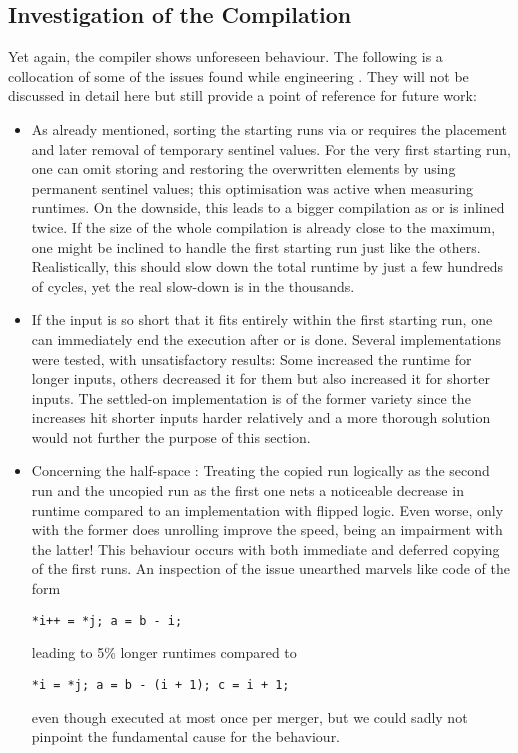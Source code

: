 \subsection*{Investigation of the Compilation}
\label{sec:tasklet:merge:compilation}

Yet again, the compiler shows unforeseen behaviour.
The following is a collocation of some of the issues found while engineering \MS{}.
They will not be discussed in detail here but still provide a point of reference for future work:
\begin{itemize}
	\item
	As already mentioned, sorting the starting runs via \IS{} or \ShS{} requires the placement and later removal of temporary sentinel values.
	For the very first starting run, one can omit storing and restoring the overwritten elements by using permanent sentinel values;
	this optimisation was active when measuring runtimes.
	On the downside, this leads to a bigger compilation as \IS{} or \ShS{} is inlined twice.
	If the size of the whole compilation is already close to the maximum, one might be inclined to handle the first starting run just like the others.
	Realistically, this should slow down the total runtime by just a few hundreds of cycles, yet the real slow-down is in the thousands.

	\item
	If the input is so short that it fits entirely within the first starting run, one can immediately end the execution after \IS{} or \ShS{} is done.
	Several implementations were tested, with unsatisfactory results:
	Some increased the runtime for longer inputs, others decreased it for them but also increased it for shorter inputs.
	The settled-on implementation is of the former variety since the increases hit shorter inputs harder relatively and a more thorough solution would not further the purpose of this section.

	\item
	Concerning the half-space \MS{}:
	Treating the copied run logically as the second run and the uncopied run as the first one nets a noticeable decrease in runtime compared to an implementation with flipped logic.
	Even worse, only with the former does unrolling improve the speed, being an impairment with the latter!
	This behaviour occurs with both immediate and deferred copying of the first runs.
	An inspection of the issue unearthed marvels like code of the form
	\begin{center}
		\vspace{-\baselineskip}
		\texttt{*i++ = *j; a = b - i;}%
	\end{center}
	leading to 5\% longer runtimes compared to
	\begin{center}
		\texttt{*i = *j; a = b - (i + 1); c = i + 1;}%
	\end{center}
	even though executed at most once per merger, but we could sadly not pinpoint the fundamental cause for the behaviour.
\end{itemize}
